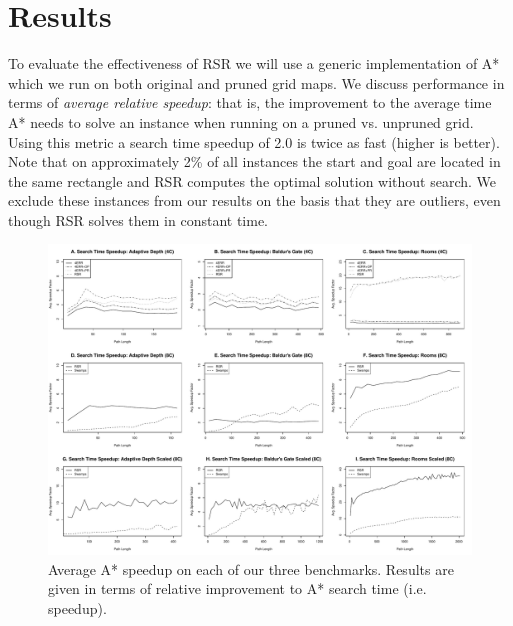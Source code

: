 \section{Results}
\label{sec-results}
To evaluate the effectiveness of RSR we will use a generic implementation of A* 
which we run on both original and pruned grid maps.
We discuss performance in terms of \emph{average relative speedup}: 
that is, the improvement to the average time A* needs to solve an instance
when running on a pruned  vs. unpruned grid.
Using this metric a search time speedup of 2.0 is twice as fast (higher is
better).
%
Note that on approximately 2\% of all instances the start and goal are located
in the same rectangle and RSR computes the optimal solution without
search.  We exclude these instances from our results on the basis that they are 
outliers, even though RSR solves them in constant time.

\par 
\begin{figure}[t]
       \begin{center}
                       \includegraphics[width=0.97\columnwidth, trim = 10mm 10mm 10mm 0mm]{diagrams/speedup.pdf}
       \end{center}
       \caption{Average A* speedup on each of our three benchmarks. 
		Results are given in terms of relative improvement to A* search time (i.e. speedup).}
\label{fig-speedup}
\end{figure}


